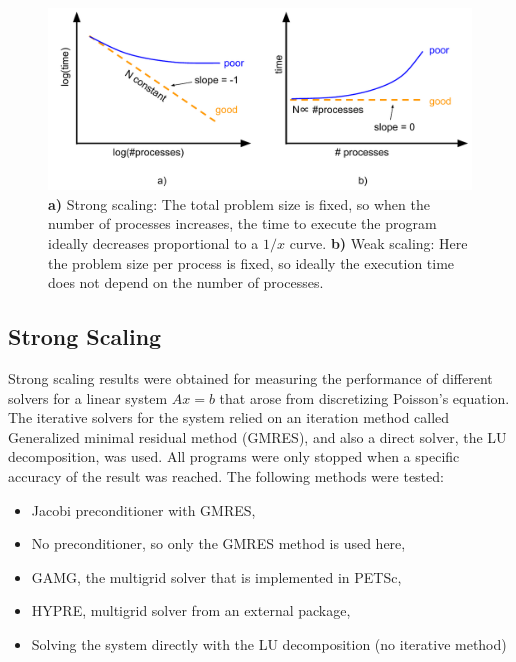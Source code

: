 \begin{figure}[tb]
	\centering
\hspace*{-7mm}	\includegraphics[width=1.\textwidth]{4_strong_weak_scaling}
	\caption{\textbf{a)} Strong scaling: The total problem size is fixed, so when the number of processes increases, the time to execute the program ideally decreases proportional to a $1/x$ curve. \textbf{b)} Weak scaling: Here the problem size per process is fixed, so ideally the execution time does not depend on the number of processes.}
	\label{fig:strong_weak_scaling}
\end{figure}


\subsection{Strong Scaling}


Strong scaling results were obtained for measuring the performance of different solvers for a linear system $Ax = b$ that arose from discretizing Poisson's equation. The iterative solvers for the system relied on an iteration method called Generalized minimal residual method (GMRES), and also a direct solver, the LU decomposition, was used. All programs were only stopped when a specific accuracy of the result was reached. The following methods were tested:
\begin{itemize}
\item Jacobi preconditioner with GMRES,
\item No preconditioner, so only the GMRES method is used here,
\item GAMG, the multigrid solver that is implemented in PETSc,
\item HYPRE, multigrid solver from an external package,
\item Solving the system directly with the LU decomposition (no iterative method)
\end{itemize}


